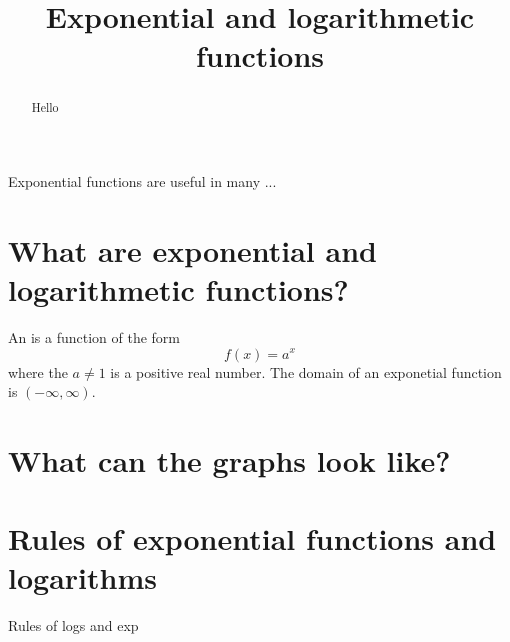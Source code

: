 \documentclass{ximera}
\title[Dig-In:]{Exponential and logarithmetic functions}
\begin{document}
\begin{abstract}
  Hello
\end{abstract}
\maketitle

Exponential functions are useful in many ... 

\section{What are exponential and logarithmetic functions?}


\begin{definition}
  An  is a function of the form
  \[
  f(x) = a^x
  \]
  where the $a\ne 1$ is a positive real number. The domain of an
  exponetial function is $(-\infty,\infty)$.
\end{definition}


\section{What can the graphs look like?}


\section{Rules of exponential functions and logarithms}
Rules of logs and exp
\end{document}
